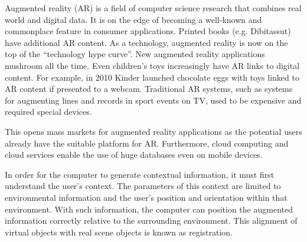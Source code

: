 Augmented reality (AR) is a field of computer science research that combines real world and digital data. It is on the edge of becoming a well-known and commonplace feature in consumer applications. Printed books (e.g. Dibitassut) have additional AR content. As a technology, augmented reality is now on the top of the “technology hype curve”. New augmented reality applications mushroom all the time. Even children’s toys increasingly have AR links to digital content. For example, in 2010 Kinder launched chocolate eggs with toys linked to AR content if presented to a webcam. Traditional AR systems, such as systems for augmenting lines and records in sport events on TV, used to be expensive and required special devices. 

This opens mass markets for augmented reality applications as the potential users already have the suitable platform for AR. Furthermore, cloud computing and cloud services enable the use of huge databases even on mobile devices.  



In order for the computer to generate contextual information, it must first understand the user’s context. The parameters of this context are limited to environmental information and the user’s position and orientation within that environment. With such information, the computer can position the augmented information correctly relative to the surrounding environment. This alignment of virtual objects with real scene objects is known as registration. 


